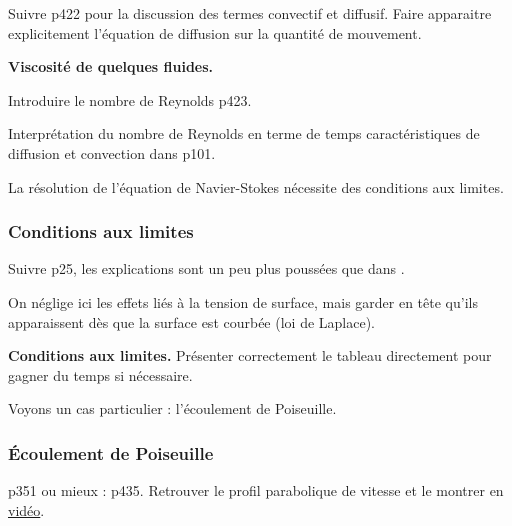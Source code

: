 Suivre \cite{Olivier2000} p422 pour la discussion des termes convectif et diffusif.
Faire apparaitre explicitement l'équation de diffusion sur la quantité de mouvement.

\begin{slide}
\textbf{Viscosité de quelques fluides.}
\end{slide}

Introduire le nombre de Reynolds \cite{Olivier2000} p423.

\begin{remarque}
Interprétation du nombre de Reynolds en terme de temps caractéristiques de diffusion et convection dans \cite{Guyon2001} p101.
\end{remarque}

\begin{transition}
La résolution de l'équation de Navier-Stokes nécessite des conditions aux limites.
\end{transition}

\subsubsection{Conditions aux limites}

Suivre \cite{Rabaud2019} p25, les explications sont un peu plus poussées que dans \cite{Sanz2016}.
\begin{remarque}
On néglige ici les effets liés à la tension de surface, mais garder en tête qu'ils apparaissent dès que la surface est courbée (loi de Laplace).
\end{remarque}

\begin{slide}
\textbf{Conditions aux limites.}
Présenter correctement le tableau directement pour gagner du temps si nécessaire.
\end{slide}

\begin{transition}
Voyons un cas particulier : l'écoulement de Poiseuille.
\end{transition}

\subsubsection{Écoulement de Poiseuille}

\cite{Sanz2016} p351 ou mieux : \cite{Olivier2000} p435.
Retrouver le profil parabolique de vitesse et le montrer en \href{http://culturesciencesphysique.ens-lyon.fr/la-physique-animee/la-physique-animee-une-serie-de-videos-de-physique}{vidéo}.

